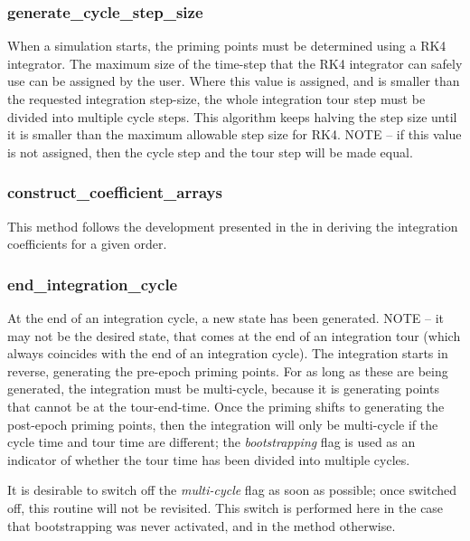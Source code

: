 \subsubsection{generate\_cycle\_step\_size}\label{ref:GJ_generate_cycle_step_size}

When a simulation starts, the priming points must be determined using a
RK4 integrator. The maximum size of the time-step that the RK4
integrator can safely use can be assigned by the user. Where this
value is assigned, and is smaller than the requested integration
step-size, the whole integration tour step must be divided into
multiple cycle steps. This algorithm keeps halving the step size
until it is smaller than the maximum allowable step size for RK4.
NOTE -- if this value is not assigned, then the cycle step and the
tour step will be made equal.

\subsubsection{construct\_coefficient\_arrays}

This method follows the development presented in the 
in deriving the integration coefficients for a
given order.


\subsubsection{end\_integration\_cycle}\label{ref:GJ_end_integration_cycle}

At the end of an integration cycle, a new state has been generated.
NOTE -- it may not be the desired state, that comes at the end of an
integration tour (which always coincides with the end of an integration
cycle).  The integration starts in reverse, generating the pre-epoch
priming points. For as long as these are being generated, the
integration must be multi-cycle, because it is generating points that
cannot be at the tour-end-time. Once the priming shifts to generating
the post-epoch priming points, then the integration will only be
multi-cycle if the cycle time and tour time are different; the
\textit{bootstrapping }flag is used as an indicator of whether the tour
time has been divided into multiple cycles.

It is desirable to switch off the \textit{multi-cycle} flag as soon as possible;
once switched off, this routine will not be
revisited. This switch is performed here in the case that bootstrapping
was never activated, and in the 
 method
otherwise.

